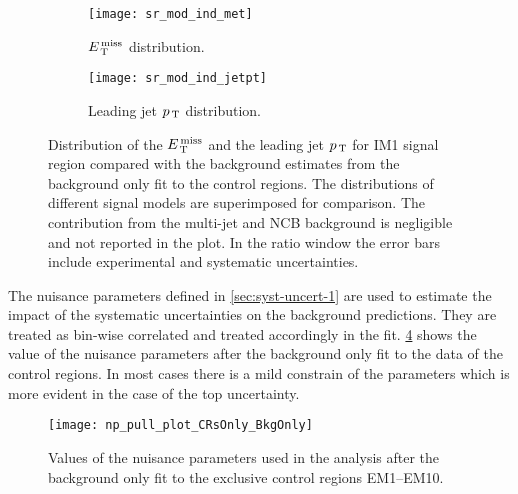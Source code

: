 \begin{figure}[!htb]
  \centering
  \begin{subfigure}[t]{.48\linewidth}
    \texttt{[image: sr\_mod\_ind\_met]}
    \caption{$E_\mathrm{\, T}^\mathrm{\, miss}$ distribution.}
    \label{fig:sr_et_miss_2016}
  \end{subfigure}
  \begin{subfigure}[t]{.48\linewidth}
    \texttt{[image: sr\_mod\_ind\_jetpt]}
    \caption{Leading jet $p_\mathrm{\, T}$ distribution.}
    \label{fig:sr_jet1_pt_2016}
  \end{subfigure}
  \caption{Distribution of the $E_\mathrm{\, T}^\mathrm{\, miss}$ and the leading jet $p_\mathrm{\, T}$ for IM1 signal
    region compared with the background estimates from the background only fit
    to the control regions. The distributions of different signal models are
    superimposed for comparison. The contribution from the multi-jet and NCB
    background is negligible and not reported in the plot. In the ratio window
    the error bars include experimental and systematic uncertainties.}
  \label{fig:sr_plots_2016}
\end{figure}

The nuisance parameters defined in \cref{sec:syst-uncert-1} are used to estimate
the impact of the systematic uncertainties on the background predictions. They
are treated as bin-wise correlated and treated accordingly in the
fit. \cref{fig:np_pull} shows the value of the nuisance parameters after the
background only fit to the data of the control regions. In most cases there is a
mild constrain of the parameters which is more evident in the case of the top
uncertainty.
\begin{figure}[!htb]
  \centering
  \texttt{[image: np\_pull\_plot\_CRsOnly\_BkgOnly]}
  \caption{Values of the nuisance parameters used in the analysis after the
    background only fit to the exclusive control regions EM1--EM10.}
  \label{fig:np_pull}
\end{figure}

